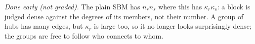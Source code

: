 \documentclass[a4paper, 11pt]{extarticle}
\begin{document}
\emph{Done early (not graded).} The plain SBM has $n_r n_s$ where this has
$\kappa_r\kappa_s$: a block is judged dense against the degrees of its members,
not their number. A group of hubs has many edges, but $\kappa_r$ is large too,
so it no longer looks surprisingly dense; the groups are free to follow who
connects to whom.
\end{document}
